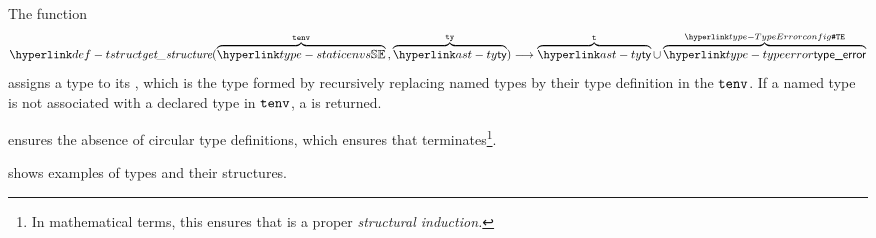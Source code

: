 \hypertarget{def-structure}{}
The function
\[
  \tstruct(\overname{\staticenvs}{\tenv} \aslsep \overname{\ty}{\tty}) \aslto \overname{\ty}{\vt} \cup \overname{\typeerror}{\TypeErrorConfig}
\]
assigns a type to its \hypertarget{def-tstruct}{\emph{\structure}}, which is the type formed by
recursively replacing named types by their type definition in the \staticenvironmentterm{} $\texttt{tenv}$.
If a named type is not associated with a declared type in $\texttt{tenv}$, a \typingerrorterm{} is returned.

 ensures the absence of circular type definitions,
which ensures that  terminates\footnote{In mathematical terms,
this ensures that  is a proper \emph{structural induction.}}.

 shows examples of types and their structures.

